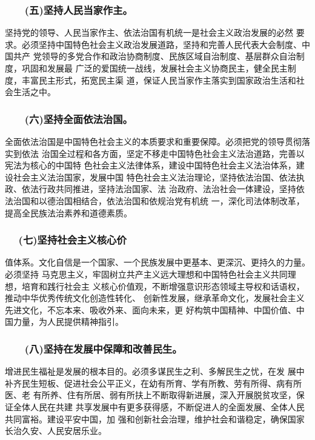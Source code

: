 \documentclass[11pt]{ctexart}
\begin{document}
{{{{\subsubsection{　　(五)坚持人民当家作主。}
\label{sec:org88beb1a}

坚持党的领导、人民当家作主、依法治国有机统一是社会主义政治发展的必然
要求。必须坚持中国特色社会主义政治发展道路，坚持和完善人民代表大会制度、中国共产
党领导的多党合作和政治协商制度、民族区域自治制度、基层群众自治制度，巩固和发展最
广泛的爱国统一战线，发展社会主义协商民主，健全民主制度，丰富民主形式，拓宽民主渠
道，保证人民当家作主落实到国家政治生活和社会生活之中。

\subsubsection{　　(六)坚持全面依法治国。}
\label{sec:org94f528c}
全面依法治国是中国特色社会主义的本质要求和重要保障。必须把党的领导贯彻落实到依法
治国全过程和各方面，坚定不移走中国特色社会主义法治道路，完善以宪法为核心的中国特
色社会主义法律体系，建设中国特色社会主义法治体系，建设社会主义法治国家，发展中国
特色社会主义法治理论，坚持依法治国、依法执政、依法行政共同推进，坚持法治国家、法
治政府、法治社会一体建设，坚持依法治国和以德治国相结合，依法治国和依规治党有机统
一，深化司法体制改革，提高全民族法治素养和道德素质。

\subsubsection{　 (七)坚持社会主义核心价}
\label{sec:orgb1782f3}
值体系。文化自信是一个国家、一个民族发展中更基本、更深沉、更持久的力量。必须坚持
马克思主义，牢固树立共产主义远大理想和中国特色社会主义共同理想，培育和践行社会主
义核心价值观，不断增强意识形态领域主导权和话语权，推动中华优秀传统文化创造性转化、
创新性发展，继承革命文化，发展社会主义先进文化，不忘本来、吸收外来、面向未来，更
好构筑中国精神、中国价值、中国力量，为人民提供精神指引。

\subsubsection{　　(八)坚持在发展中保障和改善民生。}
\label{sec:org5ca5426}

增进民生福祉是发展的根本目的。必须多谋民生之利、多解民生之忧，在发
展中补齐民生短板、促进社会公平正义，在幼有所育、学有所教、劳有所得、病有所医、老
有所养、住有所居、弱有所扶上不断取得新进展，深入开展脱贫攻坚，保证全体人民在共建
共享发展中有更多获得感，不断促进人的全面发展、全体人民共同富裕。建设平安中国，加
强和创新社会治理，维护社会和谐稳定，确保国家长治久安、人民安居乐业。

}}}}
\end{document}
